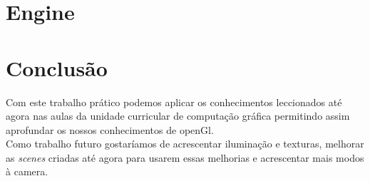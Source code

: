 \documentclass[a4paper]{report}
\begin{document}
\chapter{Engine}

\chapter{Conclusão}
Com este trabalho prático podemos aplicar os conhecimentos leccionados até agora
nas aulas da unidade curricular de computação gráfica permitindo assim
aprofundar os nossos conhecimentos de openGl.\\
Como trabalho futuro gostaríamos de acrescentar iluminação e texturas, melhorar
as \textit{scenes} criadas até agora para usarem essas melhorias e acrescentar
mais modos à camera.
\end{document}
